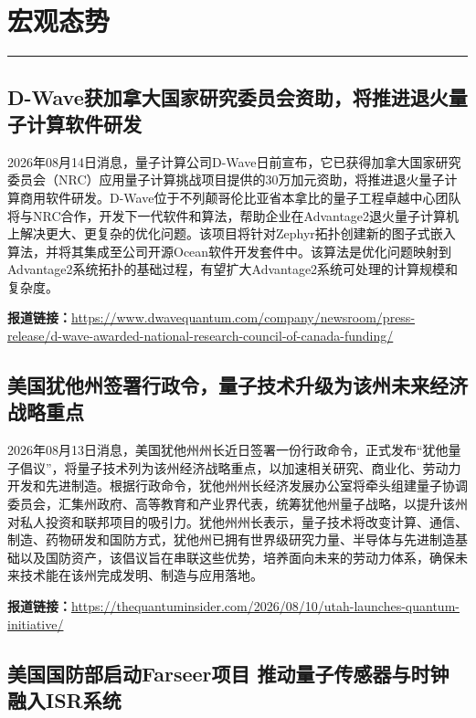 \documentclass[12pt,a4paper]{ctexart}
\begin{document}
\newpage
\section{宏观态势}
\vspace{-0.5em}
\noindent\rule{\linewidth}{1.5pt}

\subsection{ D-Wave获加拿大国家研究委员会资助，将推进退火量子计算软件研发 }

2026年08月14日消息，量子计算公司D-Wave日前宣布，它已获得加拿大国家研究委员会（NRC）应用量子计算挑战项目提供的30万加元资助，将推进退火量子计算商用软件研发。D-Wave位于不列颠哥伦比亚省本拿比的量子工程卓越中心团队将与NRC合作，开发下一代软件和算法，帮助企业在Advantage2退火量子计算机上解决更大、更复杂的优化问题。该项目将针对Zephyr拓扑创建新的图子式嵌入算法，并将其集成至公司开源Ocean软件开发套件中。该算法是优化问题映射到Advantage2系统拓扑的基础过程，有望扩大Advantage2系统可处理的计算规模和复杂度。

\noindent\textbf{报道链接：}\url{https://www.dwavequantum.com/company/newsroom/press-release/d-wave-awarded-national-research-council-of-canada-funding/}

\subsection{ 美国犹他州签署行政令，量子技术升级为该州未来经济战略重点 }

2026年08月13日消息，美国犹他州州长近日签署一份行政命令，正式发布“犹他量子倡议”，将量子技术列为该州经济战略重点，以加速相关研究、商业化、劳动力开发和先进制造。根据行政命令，犹他州州长经济发展办公室将牵头组建量子协调委员会，汇集州政府、高等教育和产业界代表，统筹犹他州量子战略，以提升该州对私人投资和联邦项目的吸引力。犹他州州长表示，量子技术将改变计算、通信、制造、药物研发和国防方式，犹他州已拥有世界级研究力量、半导体与先进制造基础以及国防资产，该倡议旨在串联这些优势，培养面向未来的劳动力体系，确保未来技术能在该州完成发明、制造与应用落地。

\noindent\textbf{报道链接：}\url{https://thequantuminsider.com/2026/08/10/utah-launches-quantum-initiative/}

\subsection{ 美国国防部启动Farseer项目 推动量子传感器与时钟融入ISR系统 }
\end{document}
